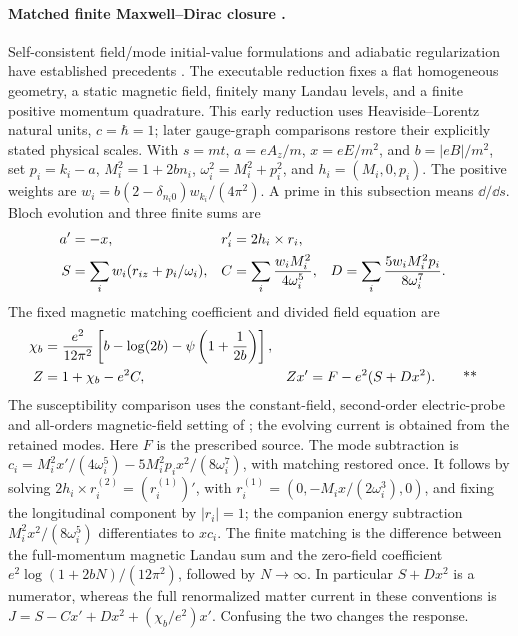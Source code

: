 \paragraph{Matched finite Maxwell--Dirac closure \workstar.}
Self-consistent field/mode initial-value formulations and adiabatic
regularization have established precedents \cite{kluger1993pair}.
The executable reduction fixes a flat homogeneous geometry, a static magnetic
field, finitely many Landau levels, and a finite positive momentum quadrature.
This early reduction uses Heaviside--Lorentz natural units, $c=\hbar=1$;
later gauge-graph comparisons restore their explicitly stated physical scales.
With \(s=mt\), \(a=eA_z/m\), \(x=eE/m^2\), and \(b=|eB|/m^2\), set
\(p_i=k_i-a\), \(M_i^2=1+2bn_i\), \(\omega_i^2=M_i^2+p_i^2\), and
\(h_i=(M_i,0,p_i)\).  The positive weights are
\(w_i=b(2-\delta_{n_i0})w_{k_i}/(4\pi^2)\).  A prime in this subsection means
\(\dd/\dd s\).  Bloch evolution and three finite sums are
\begin{align}
 a'&=-x,& r_i'&=2h_i\times r_i,\notag\\
 S&=\sum_iw_i(r_{iz}+p_i/\omega_i),&
 C&=\sum_i\frac{w_iM_i^2}{4\omega_i^5},&
 D&=\sum_i\frac{5w_iM_i^2p_i}{8\omega_i^7}.
 \label{early:bloch}
\end{align}
The fixed magnetic matching coefficient and divided field equation are
\begin{align}
 \chi_b&=\frac{e^2}{12\pi^2}
 \left[b-\log(2b)-\psi\left(1+\frac1{2b}\right)\right],\notag\\
 Z&=1+\chi_b-e^2C,& Zx'&=F-e^2(S+Dx^2).
 \qquad\text{**}\label{early:matched}
\end{align}
The susceptibility comparison uses the constant-field, second-order
electric-probe and all-orders magnetic-field setting of
\cite{mages2010euler}; the evolving current is obtained from the retained modes.
Here \(F\) is the prescribed source.  The mode subtraction is
\(c_i=M_i^2x'/(4\omega_i^5)-5M_i^2p_ix^2/(8\omega_i^7)\), with matching
restored once.  It follows by solving
\(2h_i\times r_i^{(2)}=(r_i^{(1)})'\), with
\(r_i^{(1)}=(0,-M_ix/(2\omega_i^3),0)\), and fixing the longitudinal
component by \(|r_i|=1\); the companion energy subtraction
\(M_i^2x^2/(8\omega_i^5)\) differentiates to \(xc_i\).
The finite matching is the difference between the full-momentum magnetic
Landau sum and the zero-field coefficient
\(e^2\log(1+2bN)/(12\pi^2)\), followed by \(N\to\infty\).
In particular \(S+Dx^2\) is a numerator, whereas the full
renormalized matter current in these conventions is
\(J=S-Cx'+Dx^2+(\chi_b/e^2)x'\).  Confusing the two changes the response.

